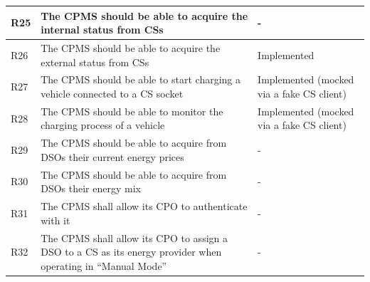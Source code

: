 \documentclass[11pt]{article}
\begin{document}
\begin{table}[H]
\begin{tabularx}{\textwidth}{|>{\centering\hsize=0.15\hsize}X|>{\hsize=1.425\hsize}X|>{\hsize=1.425\hsize}X|}
        \hline
        R25 & The CPMS should be able to acquire the internal status from CSs & - \\
        \hline
        R26 & The CPMS should be able to acquire the external status from CSs & Implemented \\
        \hline
        R27 & The CPMS should be able to start charging a vehicle connected to a CS socket & Implemented (mocked via a fake CS client) \\
        \hline
        R28 & The CPMS should be able to monitor the charging process of a vehicle & Implemented (mocked via a fake CS client) \\
        \hline
        R29 & The CPMS should be able to acquire from DSOs their current energy prices & - \\
        \hline
        R30 & The CPMS should be able to acquire from DSOs their energy mix & - \\
        \hline
        R31 & The CPMS shall allow its CPO to authenticate with it & - \\
        \hline
        R32 & The CPMS shall allow its CPO to assign a DSO to a CS as its energy provider  when operating in “Manual Mode” & - \\
        \hline
    \end{tabularx}
    \label{tab:requirements}
\end{table}
\end{document}
